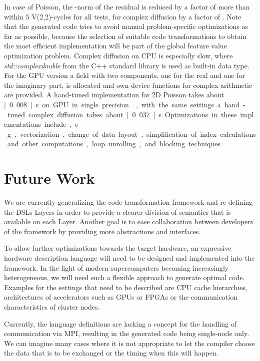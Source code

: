 \documentclass[onecolumn]{svjour3}
\begin{document}
In case of Poisson, the -norm of the residual is reduced by a factor of more than  within 5 V(2,2)-cycles for all tests,
for complex diffusion by a factor of . Note that the generated code tries to avoid manual problem-specific optimizations as far as possible, because the selection of suitable code transformations to obtain the most efficient implementation will be part of the global feature value optimization problem. Complex diffusion on CPU is especially slow, where \textit{std::complexdouble} from the C++ standard library is used as built-in data type. For the GPU version a field with two components, one for the real and one for the imaginary part, is allocated and own device functions for complex arithmetic are provided.
A hand-tuned implementation for 2D Poisson takes about \unit[0.008]{s} on GPU in single precision~\cite{koestler13HDR}, with the same settings a hand-tuned complex diffusion takes about \unit[0.037]{s}. Optimizations in these implementations include, e.\,g., vectorization, change of data layout, simplification of index calculations and other computations, loop unrolling, and blocking techniques. 
 



\section{Future Work}
\label{sec:conclusion}

We are currently generalizing the code transformation framework and re-defining the \acp{DSL} Layers in order to provide a clearer division of semantics that is available on each Layer.
Another goal is to ease collaboration between developers of the framework by providing more abstractions and interfaces.

To allow further optimizations towards the target hardware, an expressive hardware description language will need to be designed and implemented into the framework.
In the light of modern supercomputers becoming increasingly heterogeneous, we will need such a flexible approach to generate optimal code.
Examples for the settings that need to be described are CPU cache hierarchies, architectures of accelerators such as GPUs or \acp{FPGA} or the communication characteristics of cluster nodes.

Currently, the language definitions are lacking a concept for the handling of communication via MPI, resulting in the generated code being single-node only.
We can imagine many cases where it is not appropriate to let the compiler choose the data that is to be exchanged or the timing when this will happen.
\end{document}
